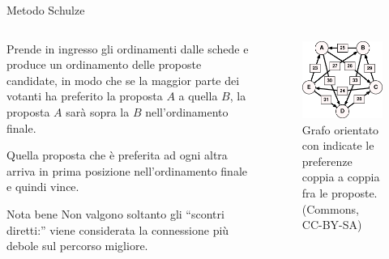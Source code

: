 \begin{frame}{Metodo Schulze}
\begin{columns}
\begin{column}{.666\textwidth}
Prende in ingresso gli ordinamenti dalle schede e produce un ordinamento delle proposte candidate, in modo che se la maggior parte dei votanti ha preferito la proposta $A$ a quella $B$, la proposta $A$ sarà sopra la $B$ nell'ordinamento finale.

\alert{Quella proposta che è preferita ad ogni altra arriva in prima posizione  nell'ordinamento finale e quindi vince}.

\begin{block}{Nota bene}
Non valgono soltanto gli ``scontri diretti:'' viene considerata la connessione più debole sul percorso migliore.
\end{block}
\end{column}
\begin{column}{.333\textwidth}
\begin{figure}
\centering\includegraphics[width=\textwidth]{pics/Schulze_method_example1}
\caption{Grafo orientato con indicate le preferenze coppia a coppia fra le proposte. (Commons, CC-BY-SA)}
\end{figure}
\end{column}
\end{columns}
\end{frame}
